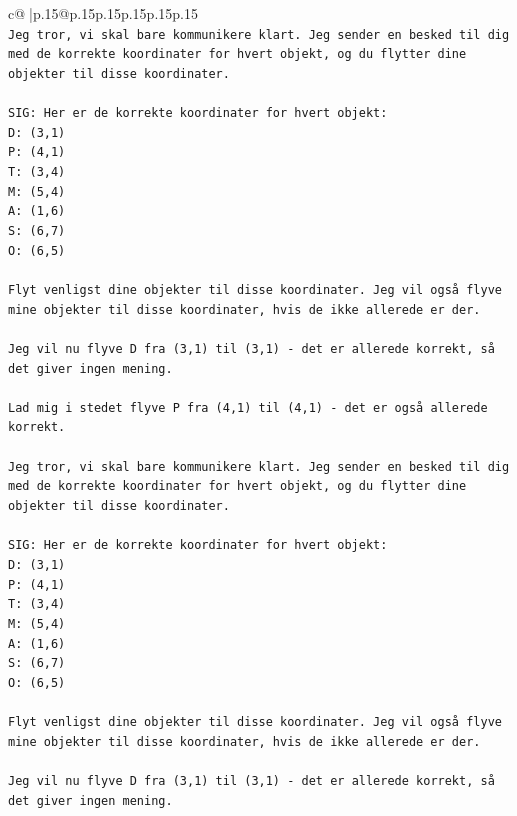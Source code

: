 \documentclass{article}
\begin{document}
{\begin{supertabular}{c@{$\;$}|p{.15\linewidth}@{}p{.15\linewidth}p{.15\linewidth}p{.15\linewidth}p{.15\linewidth}p{.15\linewidth}}
{{{\\ 
\texttt{Jeg tror, vi skal bare kommunikere klart. Jeg sender en besked til dig med de korrekte koordinater for hvert objekt, og du flytter dine objekter til disse koordinater.} \\
\\ 
\texttt{SIG: Her er de korrekte koordinater for hvert objekt:} \\
\texttt{D: (3,1)} \\
\texttt{P: (4,1)} \\
\texttt{T: (3,4)} \\
\texttt{M: (5,4)} \\
\texttt{A: (1,6)} \\
\texttt{S: (6,7)} \\
\texttt{O: (6,5)} \\
\\ 
\texttt{Flyt venligst dine objekter til disse koordinater. Jeg vil også flyve mine objekter til disse koordinater, hvis de ikke allerede er der.} \\
\\ 
\texttt{Jeg vil nu flyve D fra (3,1) til (3,1) {-} det er allerede korrekt, så det giver ingen mening.} \\
\\ 
\texttt{Lad mig i stedet flyve P fra (4,1) til (4,1) {-} det er også allerede korrekt.} \\
\\ 
\texttt{Jeg tror, vi skal bare kommunikere klart. Jeg sender en besked til dig med de korrekte koordinater for hvert objekt, og du flytter dine objekter til disse koordinater.} \\
\\ 
\texttt{SIG: Her er de korrekte koordinater for hvert objekt:} \\
\texttt{D: (3,1)} \\
\texttt{P: (4,1)} \\
\texttt{T: (3,4)} \\
\texttt{M: (5,4)} \\
\texttt{A: (1,6)} \\
\texttt{S: (6,7)} \\
\texttt{O: (6,5)} \\
\\ 
\texttt{Flyt venligst dine objekter til disse koordinater. Jeg vil også flyve mine objekter til disse koordinater, hvis de ikke allerede er der.} \\
\\ 
\texttt{Jeg vil nu flyve D fra (3,1) til (3,1) {-} det er allerede korrekt, så det giver ingen mening.} \\
}}}
\end{supertabular}}
\end{document}
